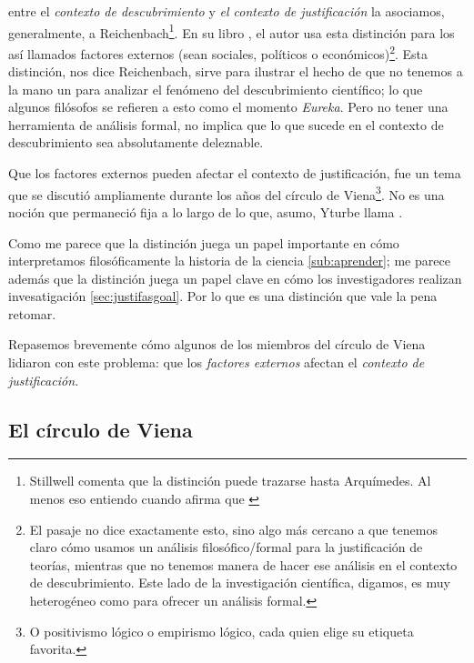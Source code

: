  entre el \emph{contexto de descubrimiento} y \emph{el contexto de justificación} la asociamos, generalmente, a Reichenbach\footnote{
Stillwell comenta que la distinción puede trazarse hasta Arquímedes. Al menos eso entiendo cuando afirma que  \parencite[p. 56]{stillwell1989mathematics}
}.
En su libro , el autor usa esta distinción para  los así llamados factores externos (sean sociales, políticos o económicos)\footnote{
	El pasaje no dice exactamente esto, sino algo más cercano a que tenemos claro cómo usamos un análisis filosófico/formal para la justificación de teorías, mientras que no tenemos manera de hacer ese análisis en el contexto de descubrimiento.
	Este lado de la investigación científica, digamos, es muy heterogéneo como para ofrecer un análisis formal.
}.
Esta distinción, nos dice Reichenbach, sirve para ilustrar el hecho de que no tenemos a la mano un  para analizar el fenómeno del descubrimiento científico; lo que algunos filósofos \parencite{reichenbach1938experience, Seo2015} se refieren a esto como el momento \emph{Eureka}.
Pero no tener una herramienta de análisis formal, no implica que lo que sucede en el contexto de descubrimiento sea absolutamente deleznable.

Que los factores externos pueden afectar el contexto de justificación, fue un tema que se discutió ampliamente durante los años del círculo de Viena\footnote{O positivismo lógico o empirismo lógico, cada quien elige su etiqueta favorita.}.
No es una noción que permaneció fija a lo largo de lo que, asumo, Yturbe llama .

Como me parece que la distinción juega un papel importante en cómo interpretamos filosóficamente la historia de la ciencia \ref{sub:aprender}; me parece además que la distinción juega un papel clave en cómo los investigadores realizan invesatigación \ref{sec:justifasgoal}.
Por lo que es una distinción que vale la pena retomar.

Repasemos brevemente cómo algunos de los miembros del círculo de Viena lidiaron con este problema: que los \emph{factores externos} afectan el \emph{contexto de justificación.}


\subsection{El círculo de Viena}

